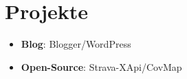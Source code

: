 \documentclass[letterpaper,11pt]{article}
\newcommand{\resumeItem}[2]{
  \item\small{
    \textbf{#1}{: #2 \vspace{-2pt}}
  }
}
\newcommand{\resumeSubItem}[2]{\resumeItem{#1}{#2}\vspace{-4pt}}
\newcommand{\resumeSubHeadingListStart}{\begin{itemize}[leftmargin=*]}
\newcommand{\resumeSubHeadingListEnd}{\end{itemize}}
\begin{document}
\section{Projekte}
  \resumeSubHeadingListStart
    \resumeSubItem{Blog}
      {Blogger/WordPress}
    \resumeSubItem{Open-Source}
      {Strava-XApi/CovMap}
  \resumeSubHeadingListEnd

%
\end{document}
